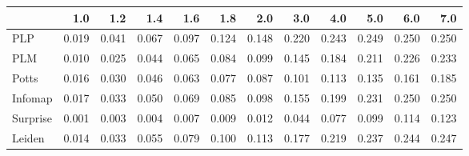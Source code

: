 \begin{tabular}{lrrrrrrrrrrr}
\toprule
{} &   1.0 &   1.2 &   1.4 &   1.6 &   1.8 &   2.0 &   3.0 &   4.0 &   5.0 &   6.0 &   7.0 \\
\midrule
PLP      & 0.019 & 0.041 & 0.067 & 0.097 & 0.124 & 0.148 & 0.220 & 0.243 & 0.249 & 0.250 & 0.250 \\
PLM      & 0.010 & 0.025 & 0.044 & 0.065 & 0.084 & 0.099 & 0.145 & 0.184 & 0.211 & 0.226 & 0.233 \\
Potts    & 0.016 & 0.030 & 0.046 & 0.063 & 0.077 & 0.087 & 0.101 & 0.113 & 0.135 & 0.161 & 0.185 \\
Infomap  & 0.017 & 0.033 & 0.050 & 0.069 & 0.085 & 0.098 & 0.155 & 0.199 & 0.231 & 0.250 & 0.250 \\
Surprise & 0.001 & 0.003 & 0.004 & 0.007 & 0.009 & 0.012 & 0.044 & 0.077 & 0.099 & 0.114 & 0.123 \\
Leiden   & 0.014 & 0.033 & 0.055 & 0.079 & 0.100 & 0.113 & 0.177 & 0.219 & 0.237 & 0.244 & 0.247 \\
\bottomrule
\end{tabular}
